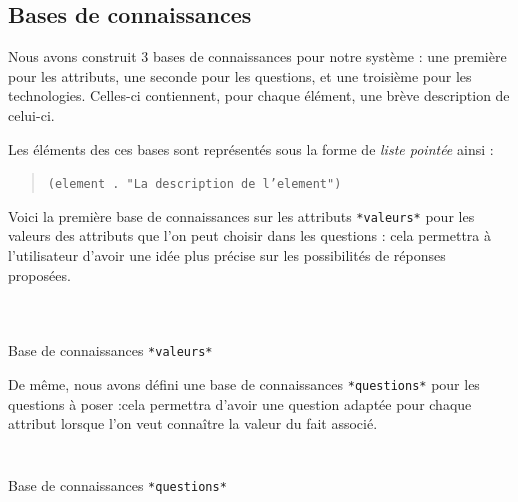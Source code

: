 \documentclass[a4paper,12pt]{article}
\begin{document}
\newpage
\subsection{Bases de connaissances}

Nous avons construit 3 bases de connaissances pour notre système : une première pour les attributs, une seconde pour les questions, et une troisième pour les technologies. Celles-ci contiennent, pour chaque élément, une brève description de celui-ci.

Les éléments des ces bases sont représentés sous la forme de \textit{liste pointée} ainsi :

\begin{quotation}
	\texttt{(element . "La description de l'element")}
\end{quotation}
 
 Voici la première base de connaissances sur les attributs \texttt{*valeurs*} pour les valeurs des attributs que l'on peut choisir dans les questions : cela permettra à l'utilisateur d'avoir une idée plus précise sur les possibilités de réponses proposées.

\begin{listing}[H]
	\centering
	\inputminted[breaklines=true,linenos,lastline=32]{lisp}{../valeurs.lisp}
\end{listing}

\begin{listing}[H]
	\centering
	\inputminted[breaklines=true,linenos,firstline=33,lastline=69]{lisp}{../valeurs.lisp}
\end{listing}

\begin{listing}[H]
	\centering
	\inputminted[breaklines=true,linenos,firstline=70]{lisp}{../valeurs.lisp}
	\caption{Base de connaissances \texttt{*valeurs*}}
\end{listing}
 

De même, nous avons défini une base de connaissances \texttt{*questions*} pour les questions à poser :cela permettra d'avoir une question adaptée pour chaque attribut lorsque l'on veut connaître la valeur du fait associé.

\begin{listing}[H]
	\centering
	\inputminted[breaklines=true,linenos,lastline=23]{lisp}{../questions.lisp}
\end{listing}


\begin{listing}[H]
	\centering
	\inputminted[breaklines=true,linenos,firstline=24]{lisp}{../questions.lisp}
	\caption{Base de connaissances \texttt{*questions*}}
\end{listing}
\end{document}
